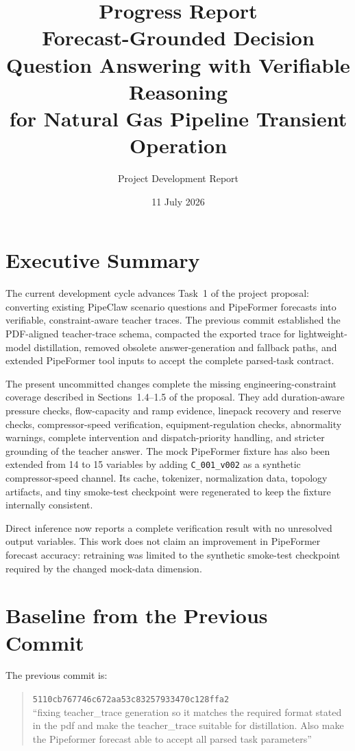 \documentclass[11pt,a4paper]{article}
\title{Progress Report\\
\large Forecast-Grounded Decision Question Answering with Verifiable Reasoning\\
for Natural Gas Pipeline Transient Operation}
\author{Project Development Report}
\date{11 July 2026}
\newcommand{\code}[1]{\texttt{#1}}
\begin{document}
\maketitle

\section{Executive Summary}

The current development cycle advances Task~1 of the project proposal: converting existing PipeClaw scenario questions and PipeFormer forecasts into verifiable, constraint-aware teacher traces. The previous commit established the PDF-aligned teacher-trace schema, compacted the exported trace for lightweight-model distillation, removed obsolete answer-generation and fallback paths, and extended PipeFormer tool inputs to accept the complete parsed-task contract.

The present uncommitted changes complete the missing engineering-constraint coverage described in Sections~1.4--1.5 of the proposal. They add duration-aware pressure checks, flow-capacity and ramp evidence, linepack recovery and reserve checks, compressor-speed verification, equipment-regulation checks, abnormality warnings, complete intervention and dispatch-priority handling, and stricter grounding of the teacher answer. The mock PipeFormer fixture has also been extended from 14 to 15 variables by adding \code{C\_001\_v002} as a synthetic compressor-speed channel. Its cache, tokenizer, normalization data, topology artifacts, and tiny smoke-test checkpoint were regenerated to keep the fixture internally consistent.

Direct inference now reports a complete verification result with no unresolved output variables. This work does not claim an improvement in PipeFormer forecast accuracy: retraining was limited to the synthetic smoke-test checkpoint required by the changed mock-data dimension.

\section{Baseline from the Previous Commit}

The previous commit is:

\begin{quote}
\code{5110cb767746c672aa53c83257933470c128ffa2}\\
``fixing teacher\_trace generation so it matches the required format stated in the pdf and make the teacher\_trace suitable for distillation. Also make the Pipeformer forecast able to accept all parsed task parameters''
\end{quote}
\end{document}
